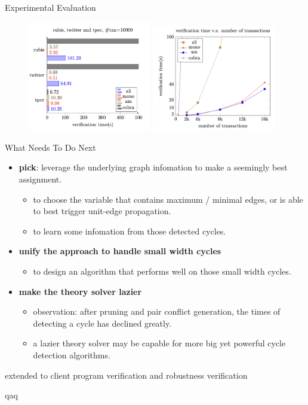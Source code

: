 \begin{frame}{Experimental Evaluation}
	\begin{figure}[H]
		\centering
		\includegraphics[width=0.48\textwidth]{figs/ser-checker-rubis-twitter-and-tpcc-ntxn10000.png}
		\includegraphics[width=0.48\textwidth]{figs/ser-checker-chengRW-verification-time-vs-ntxns.png}
	\end{figure}
\end{frame}

\begin{frame}{What Needs To Do Next}
	\begin{itemize}
		\item \textbf{pick}: leverage the underlying graph infomation to make a seemingly best assignment.
		\begin{itemize}
			\item to choose the variable that contains maximum / minimal edges, or is able to best trigger unit-edge propagation. 
			\item to learn some infomation from those detected cycles.
		\end{itemize}
		\item \textbf{unify the approach to handle small width cycles}
		\begin{itemize}
			\item to design an algorithm that performs well on those small width cycles.
		\end{itemize}
		\item \textbf{make the theory solver lazier}
		\begin{itemize}
			\item observation: after pruning and pair conflict generation, the times of detecting a cycle has declined greatly.
			\item a lazier theory solver may be capable for more big yet powerful cycle detection algorithms.  
		\end{itemize}
	\end{itemize}
\end{frame}

\begin{frame}
	extended to client program verification and robustness verification

	qaq
\end{frame}
